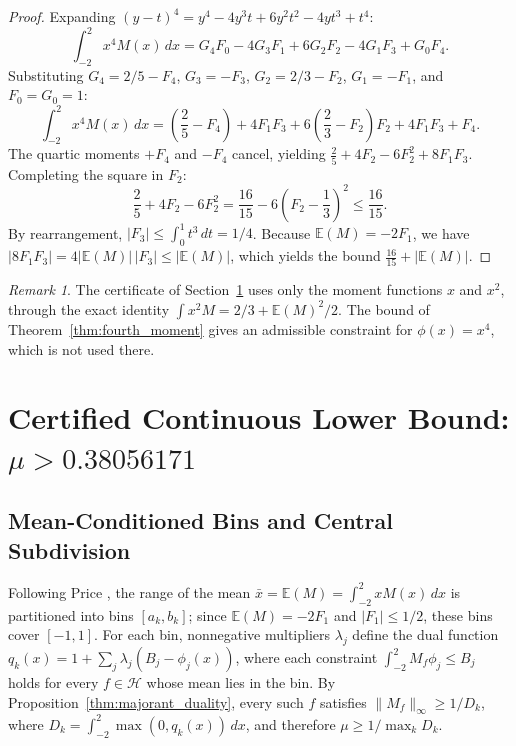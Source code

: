 \documentclass[11pt,a4paper]{article}
\theoremstyle{definition}
\theoremstyle{remark}
\newtheorem{remark}[theorem]{Remark}
\newcommand{\E}{\mathbb{E}}
\begin{document}
\begin{proof}
Expanding $(y - t)^4 = y^4 - 4y^3t + 6y^2t^2 - 4yt^3 + t^4$:
\begin{equation}
\int_{-2}^2 x^4 M(x) \, dx = G_4 F_0 - 4 G_3 F_1 + 6 G_2 F_2 - 4 G_1 F_3 + G_0 F_4.
\end{equation}
Substituting $G_4 = 2/5 - F_4$, $G_3 = -F_3$, $G_2 = 2/3 - F_2$, $G_1 = -F_1$, and $F_0 = G_0 = 1$:
\begin{equation}
\int_{-2}^2 x^4 M(x) \, dx = \left(\frac{2}{5} - F_4\right) + 4F_1F_3 + 6\left(\frac{2}{3} - F_2\right)F_2 + 4F_1F_3 + F_4.
\end{equation}
The quartic moments $+F_4$ and $-F_4$ cancel, yielding $\frac{2}{5} + 4F_2 - 6F_2^2 + 8F_1F_3$. Completing the square in $F_2$:
\begin{equation}
\frac{2}{5} + 4F_2 - 6F_2^2 = \frac{16}{15} - 6\left(F_2 - \frac{1}{3}\right)^2 \le \frac{16}{15}.
\end{equation}
By rearrangement, $|F_3| \le \int_0^1 t^3 \, dt = 1/4$.
Because $\E(M) = -2F_1$, we have $|8F_1F_3| = 4|\E(M)| \, |F_3| \le |\E(M)|$,
which yields the bound $\frac{16}{15} + |\E(M)|$.
\end{proof}

\begin{remark}
The certificate of Section~\ref{sec:certificate} uses only the moment functions $x$ and $x^2$, through the exact identity $\int x^2 M = 2/3 + \E(M)^2/2$. The bound of Theorem~\ref{thm:fourth_moment} gives an admissible constraint for $\phi(x) = x^4$, which is not used there.
\end{remark}

\section{Certified Continuous Lower Bound: \texorpdfstring{$\mu > 0.38056171$}{mu > 0.38056171}}
\label{sec:certificate}

\subsection{Mean-Conditioned Bins and Central Subdivision}

Following Price \cite{price2026}, the range of the mean $\bar{x} = \E(M) = \int_{-2}^2 x M(x) \, dx$ is partitioned into bins $[a_k, b_k]$; since $\E(M) = -2F_1$ and $|F_1| \le 1/2$, these bins cover $[-1, 1]$. For each bin, nonnegative multipliers $\lambda_j$ define the dual function $q_k(x) = 1 + \sum_j \lambda_j (B_j - \phi_j(x))$, where each constraint $\int_{-2}^2 M_f \phi_j \le B_j$ holds for every $f \in \mathcal{H}$ whose mean lies in the bin. By Proposition~\ref{thm:majorant_duality}, every such $f$ satisfies $\|M_f\|_\infty \ge 1/D_k$, where $D_k = \int_{-2}^2 \max(0, q_k(x)) \, dx$, and therefore $\mu \ge 1/\max_k D_k$.
\end{document}
